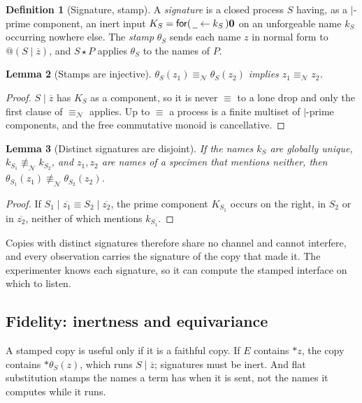 \documentclass[11pt]{article}
\makeatletter
\theoremstyle{definition}
\newtheorem{definition}{Definition}[section]
\theoremstyle{plain}
\newtheorem{lemma}[definition]{Lemma}
\theoremstyle{remark}
\newcommand{\quo}[1]{@#1}
\newcommand{\drp}[1]{{*}#1}
\newcommand{\dr}[1]{\overline{#1}}
\newcommand{\inp}[3]{\mathsf{for}(\,#1 \leftarrow #2\,)#3}
\newcommand{\nequiv}{\equiv_{\mathcal{N}}}
\newcommand{\nil}{\mathbf{0}}
\newcommand{\wild}{\mathord{\underline{\hspace{0.5em}}}}
\newcommand{\act}{\mathbin{\star}}
\makeatother
\begin{document}
\begin{definition}[Signature, stamp]
A \emph{signature} is a closed process $S$ having, as a $\mid$-prime
component, an inert input $K_S = \inp{\wild}{k_S}{\nil}$ on an
unforgeable name $k_S$ occurring nowhere else. The \emph{stamp}
$\theta_S$ sends each name $z$ in normal form to $\quo{(S \mid \dr{z})}$,
and $S \act P$ applies $\theta_S$ to the names of $P$.
\end{definition}

\begin{lemma}[Stamps are injective]\label{lem:injective}
$\theta_S(z_1) \nequiv \theta_S(z_2)$ implies $z_1 \nequiv z_2$.
\end{lemma}

\begin{proof}
$S \mid \dr{z}$ has $K_S$ as a component, so it is never $\equiv$ to a
lone drop and only the first clause of $\nequiv$ applies. Up to $\equiv$
a process is a finite multiset of $\mid$-prime components, and the free
commutative monoid is cancellative.
\end{proof}

\begin{lemma}[Distinct signatures are disjoint]\label{lem:disjoint}
If the names $k_S$ are globally unique, $k_{S_1} \not\nequiv k_{S_2}$, and
$z_1, z_2$ are names of a specimen that mentions neither, then
$\theta_{S_1}(z_1) \not\nequiv \theta_{S_2}(z_2)$.
\end{lemma}

\begin{proof}
If $S_1 \mid \dr{z_1} \equiv S_2 \mid \dr{z_2}$, the prime component
$K_{S_1}$ occurs on the right, in $S_2$ or in $\dr{z_2}$, neither of
which mentions $k_{S_1}$.
\end{proof}

Copies with distinct signatures therefore share no channel and cannot
interfere, and every observation carries the signature of the copy that
made it. The experimenter knows each signature, so it can compute the
stamped interface on which to listen.

\subsection{Fidelity: inertness and equivariance}

A stamped copy is useful only if it is a faithful copy. If $E$ contains
$\drp{z}$, the copy contains $\drp{\theta_S(z)}$, which runs $S \mid
\dr{z}$; signatures must be inert. And flat substitution stamps the names
a term has when it is sent, not the names it computes while it runs.
\end{document}
